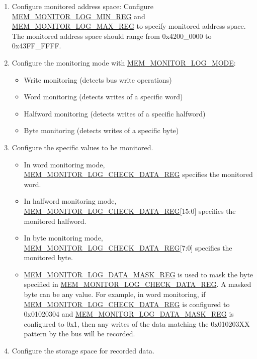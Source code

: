 \documentclass[main\_\_EN.tex]{subfiles}
\begin{document}
\begin{enumerate}
    \item Configure monitored address space: Configure \hyperref[regdesc:MEMMONITORLOGMINREG]{MEM\_MONITOR\_LOG\_MIN\_REG} and \hyperref[regdesc:MEMMONITORLOGMAXREG]{MEM\_MONITOR\_LOG\_MAX\_REG} to specify monitored address space. The monitored address space should range from 0x4200\_0000 to 0x43FF\_FFFF.
    \item Configure the monitoring mode with \hyperref[fielddesc:MEMMONITORLOGMODE]{MEM\_MONITOR\_LOG\_MODE}:
        \begin{itemize}
            \item Write monitoring (detects bus write operations)
            \item Word monitoring (detects writes of a specific word)
            \item Halfword monitoring (detects writes of a specific halfword)
            \item Byte monitoring (detects writes of a specific byte)
        \end{itemize}
    \item Configure the specific values to be monitored.
        \begin{itemize}
            \item In word monitoring mode, \hyperref[regdesc:MEMMONITORLOGCHECKDATAREG]{MEM\_MONITOR\_LOG\_CHECK\_DATA\_REG} specifies the monitored word.
            \item In halfword monitoring mode, \hyperref[regdesc:MEMMONITORLOGCHECKDATAREG]{MEM\_MONITOR\_LOG\_CHECK\_DATA\_REG}[15:0] specifies the monitored halfword.
            \item In byte monitoring mode, \hyperref[regdesc:MEMMONITORLOGCHECKDATAREG]{MEM\_MONITOR\_LOG\_CHECK\_DATA\_REG}[7:0] specifies the monitored byte.
            \item \hyperref[regdesc:MEMMONITORLOGDATAMASKREG]{MEM\_MONITOR\_LOG\_DATA\_MASK\_REG} is used to mask the byte specified in \hyperref[regdesc:MEMMONITORLOGCHECKDATAREG]{MEM\_MONITOR\_LOG\_CHECK\_DATA\_REG}. A masked byte can be any value. For example, in word monitoring, if \hyperref[regdesc:MEMMONITORLOGCHECKDATAREG]{MEM\_MONITOR\_LOG\_CHECK\_DATA\_REG} is configured to 0x01020304 and \hyperref[regdesc:MEMMONITORLOGDATAMASKREG]{MEM\_MONITOR\_LOG\_DATA\_MASK\_REG} is configured to 0x1, then any writes of the data matching the 0x010203XX pattern by the bus will be recorded.
        \end{itemize}
    \item Configure the storage space for recorded data.

\end{enumerate}
\end{document}
